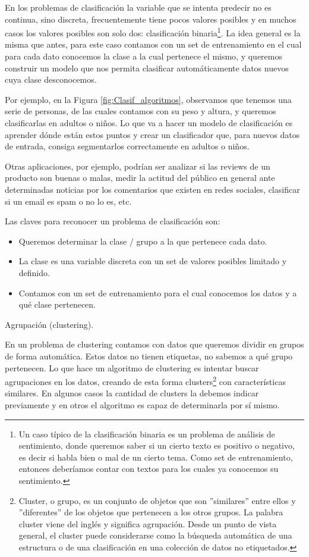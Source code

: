 \documentclass[12pt,a4paper]{article}
\makeatletter
\renewcommand\paragraph{\@startsection{paragraph}{4}{\z@}
            {-2.5ex\@plus -1ex \@minus -.25ex}
            {1.25ex \@plus .25ex}
            {\normalfont\normalsize\bfseries}}
\makeatother
\begin{document}
\begin{sloppypar}
En los problemas de clasificación la variable que se intenta predecir no es continua, sino discreta, frecuentemente tiene pocos valores posibles y en muchos casos los valores posibles son solo dos: clasificación binaria\footnote{Un caso típico de la clasificación binaria es un problema de análisis de sentimiento, donde queremos saber si un cierto texto es positivo o negativo, es decir si habla bien o mal de un cierto tema. Como set de entrenamiento, entonces deberíamos contar con textos para los cuales ya conocemos su sentimiento.}. La idea general es la misma que antes, para este caso contamos con un set de entrenamiento en el cual para cada dato conocemos la clase a la cual pertenece el mismo, y queremos construir un modelo que nos permita clasificar automáticamente datos nuevos cuya clase desconocemos.

Por ejemplo, en la Figura \ref{fig:Clasif_algoritmos}, observamos que tenemos una serie de personas, de las cuales contamos con su peso y altura, y queremos clasificarlas en adultos o niños. Lo que va a hacer un modelo de clasificación es aprender dónde están estos puntos y crear un clasificador que, para nuevos datos de entrada, consiga segmentarlos correctamente en adultos o niños.

Otras aplicaciones, por ejemplo, podrían ser analizar si las reviews de un producto son buenas o malas, medir la actitud del público en general ante determinadas noticias por los comentarios que existen en redes sociales, clasificar si un email es spam o no lo es, etc. 

Las claves para reconocer un problema de clasificación\cite{apunte_uba} son:
\begin{itemize}
\item Queremos determinar la clase / grupo a la que pertenece cada dato.
\item La clase es una variable discreta con un set de valores posibles limitado y definido.
\item Contamos con un set de entrenamiento para el cual conocemos los datos y a qué clase pertenecen.
\end{itemize}

\cleardoublepage
\paragraph{Agrupación (clustering).}\label{agrupacion}

En un problema de clustering contamos con datos que queremos dividir en grupos de forma automática. Estos datos no tienen etiquetas, no sabemos a qué grupo pertenecen. Lo que hace un algoritmo de clustering es intentar buscar agrupaciones en los datos, creando de esta forma clusters\footnote{Cluster, o grupo, es un conjunto de objetos que son ”similares” entre ellos y ”diferentes” de los objetos que pertenecen a los otros grupos. La palabra cluster viene del inglés y significa agrupación. Desde un punto de vista general, el cluster puede considerarse como la búsqueda automática de una estructura o de una clasificación en una colección de datos no etiquetados.} con características similares. En algunos casos la cantidad de clusters la debemos indicar previamente y en otros el algoritmo es capaz de determinarla por sí mismo.


\end{sloppypar}
\end{document}
